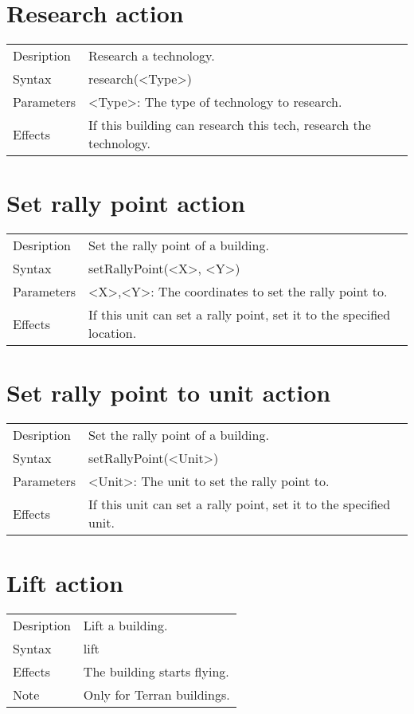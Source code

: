 \documentclass[english,11pt]{report}
\begin{document}
\section{Research action}
\begin{tabularx}{\textwidth}{lX}
 Desription & Research a technology. \\
 Syntax & research(<Type>) \\
 Parameters & <Type>: The type of technology to research.\\
 Effects &  If this building can research this tech, research the technology.
\end{tabularx}

\section{Set rally point action}
\begin{tabularx}{\textwidth}{lX}
 Desription & Set the rally point of a building. \\
 Syntax & setRallyPoint(<X>, <Y>) \\
 Parameters & <X>,<Y>: The coordinates to set the rally point to.\\
 Effects &  If this unit can set a rally point, set it to the specified location.
\end{tabularx}

\section{Set rally point to unit action}
\begin{tabularx}{\textwidth}{lX}
 Desription & Set the rally point of a building. \\
 Syntax & setRallyPoint(<Unit>) \\
 Parameters & <Unit>: The unit to set the rally point to.\\
 Effects &  If this unit can set a rally point, set it to the specified unit.
\end{tabularx}

\section{Lift action}
\begin{tabularx}{\textwidth}{lX}
 Desription & Lift a building. \\
 Syntax & lift \\
 Effects &  The building starts flying.\\
 Note & Only for Terran buildings.
\end{tabularx}
\end{document}
